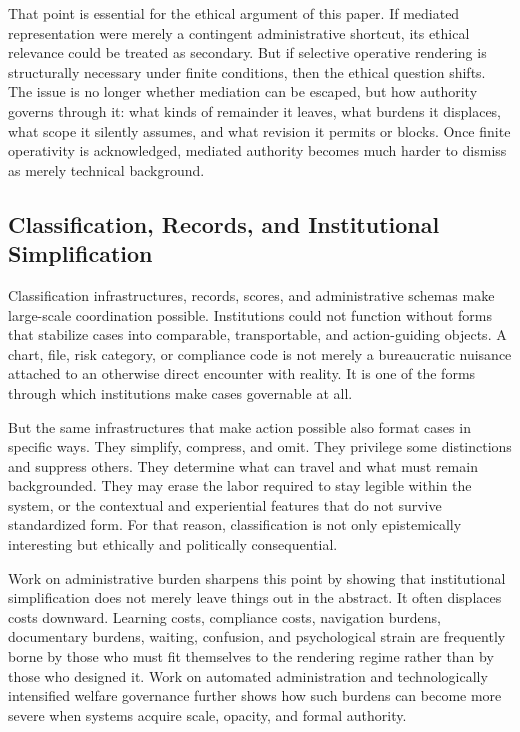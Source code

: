 \documentclass[11pt]{article}
\begin{document}
That point is essential for the ethical argument of this paper. If mediated representation were merely a contingent administrative shortcut, its ethical relevance could be treated as secondary. But if selective operative rendering is structurally necessary under finite conditions, then the ethical question shifts. The issue is no longer whether mediation can be escaped, but how authority governs through it: what kinds of remainder it leaves, what burdens it displaces, what scope it silently assumes, and what revision it permits or blocks. Once finite operativity is acknowledged, mediated authority becomes much harder to dismiss as merely technical background.

\subsection{Classification, Records, and Institutional Simplification}

Classification infrastructures, records, scores, and administrative schemas make large-scale coordination possible. Institutions could not function without forms that stabilize cases into comparable, transportable, and action-guiding objects. A chart, file, risk category, or compliance code is not merely a bureaucratic nuisance attached to an otherwise direct encounter with reality. It is one of the forms through which institutions make cases governable at all. \cite{BowkerStar1999SortingThingsOut}

But the same infrastructures that make action possible also format cases in specific ways. They simplify, compress, and omit. They privilege some distinctions and suppress others. They determine what can travel and what must remain backgrounded. They may erase the labor required to stay legible within the system, or the contextual and experiential features that do not survive standardized form. For that reason, classification is not only epistemically interesting but ethically and politically consequential. \cite{BowkerStar1999SortingThingsOut}

Work on administrative burden sharpens this point by showing that institutional simplification does not merely leave things out in the abstract. It often displaces costs downward. Learning costs, compliance costs, navigation burdens, documentary burdens, waiting, confusion, and psychological strain are frequently borne by those who must fit themselves to the rendering regime rather than by those who designed it. Work on automated administration and technologically intensified welfare governance further shows how such burdens can become more severe when systems acquire scale, opacity, and formal authority. \cite{MoynihanHerdHarvey2015AdministrativeBurden,Eubanks2018AutomatingInequality}
\end{document}
